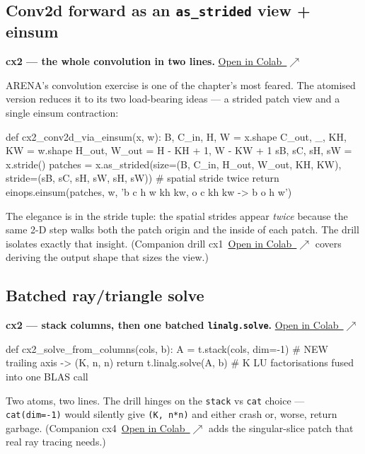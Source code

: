 \documentclass[11pt]{article}
\newcommand{\colab}[1]{\href{https://colab.research.google.com/github/AkiraTheSquid/Delta-Drills/blob/main/arena-procedural-drills/#1}{Open in Colab \,$\nearrow$}}
\begin{document}
\subsection{Conv2d forward as an \texttt{as\_strided} view + einsum}
\textbf{cx2 --- the whole convolution in two lines.} \;\colab{composites/part2/002-as-strided-then-einsum-conv-forward.ipynb}

ARENA's convolution exercise is one of the chapter's most feared. The atomised version reduces
it to its two load-bearing ideas --- a strided patch view and a single einsum contraction:

\begin{code}
def cx2_conv2d_via_einsum(x, w):
    B, C_in, H, W = x.shape
    C_out, _, KH, KW = w.shape
    H_out, W_out = H - KH + 1, W - KW + 1
    sB, sC, sH, sW = x.stride()
    patches = x.as_strided(size=(B, C_in, H_out, W_out, KH, KW),
                           stride=(sB, sC, sH, sW, sH, sW))   # spatial stride twice
    return einops.einsum(patches, w, 'b c h w kh kw, o c kh kw -> b o h w')
\end{code}

The elegance is in the stride tuple: the spatial strides appear \emph{twice} because the same
2-D step walks both the patch origin and the inside of each patch. The drill isolates exactly
that insight. (Companion drill cx1 \,\colab{composites/part2/001-as-strided-view-sized-by-conv-output-shape.ipynb}
covers deriving the output shape that sizes the view.)

\subsection{Batched ray/triangle solve}
\textbf{cx2 --- stack columns, then one batched \texttt{linalg.solve}.} \;\colab{composites/part1/002-stack-then-batched-solve.ipynb}

\begin{code}
def cx2_solve_from_columns(cols, b):
    A = t.stack(cols, dim=-1)     # NEW trailing axis -> (K, n, n)
    return t.linalg.solve(A, b)   # K LU factorisations fused into one BLAS call
\end{code}

Two atoms, two lines. The drill hinges on the \texttt{stack} vs \texttt{cat} choice ---
\texttt{cat(dim=-1)} would silently give \texttt{(K, n*n)} and either crash or, worse, return
garbage. (Companion cx4 \,\colab{composites/part1/004-patch-singular-then-batched-solve.ipynb}
adds the singular-slice patch that real ray tracing needs.)
\end{document}
